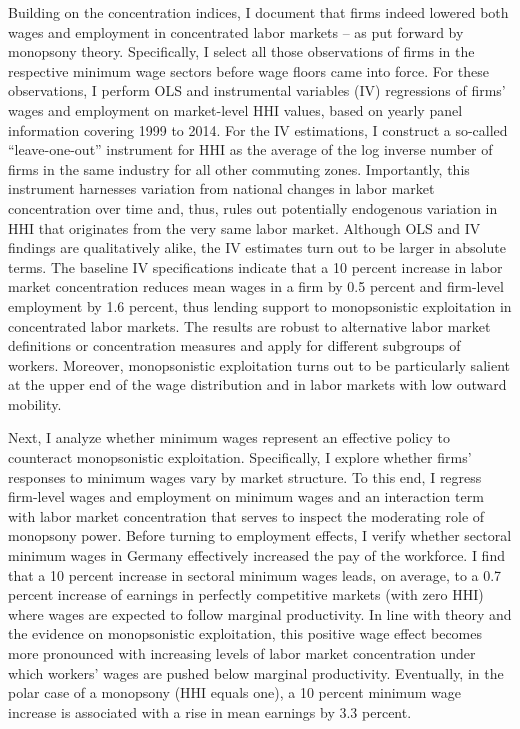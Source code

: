 \documentclass[11pt,oneside,reqno,xcolor=dvipsnames]{article} %
\begin{document}
Building on the concentration indices, I document that firms indeed lowered both wages and employment in concentrated labor markets -- as put forward by monopsony theory. Specifically, I select all those observations of firms in the respective minimum wage sectors before wage floors came into force. For these observations, I perform OLS and instrumental variables (IV) regressions of firms' wages and employment on market-level HHI values, based on yearly panel information covering 1999 to 2014. For the IV estimations, I construct a so-called ``leave-one-out'' instrument for HHI as the average of the log inverse number of firms in the same industry for all other commuting zones. Importantly, this instrument harnesses variation from national changes in labor market concentration over time and, thus, rules out potentially endogenous variation in HHI that originates from the very same labor market. Although OLS and IV findings are qualitatively alike, the IV estimates turn out to be larger in absolute terms. The baseline IV specifications indicate that a 10 percent increase in labor market concentration reduces mean wages in a firm by 0.5 percent and firm-level employment by 1.6 percent, thus lending support to monopsonistic exploitation in concentrated labor markets. The results are robust to alternative labor market definitions or concentration measures and apply for different subgroups of workers. Moreover, monopsonistic exploitation turns out to be particularly salient at the upper end of the wage distribution and in labor markets with low outward mobility.


Next, I analyze whether minimum wages represent an effective policy to counteract monopsonistic exploitation. Specifically, I explore whether firms' responses to minimum wages vary by market structure. To this end, I regress firm-level wages and employment on minimum wages and an interaction term with labor market concentration that serves to inspect the moderating role of monopsony power. Before turning to employment effects, I verify whether sectoral minimum wages in Germany effectively increased the pay of the workforce. I find that a 10 percent increase in sectoral minimum wages leads, on average, to a 0.7 percent increase of earnings in perfectly competitive markets (with zero HHI) where wages are expected to follow marginal productivity. In line with theory and the evidence on monopsonistic exploitation, this positive wage effect becomes more pronounced with increasing levels of labor market concentration under which workers' wages are pushed below marginal productivity. Eventually, in the polar case of a monopsony (HHI equals one), a 10 percent minimum wage increase is associated with a rise in mean earnings by 3.3 percent.
\end{document}
